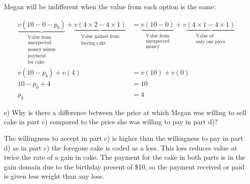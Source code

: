 \documentclass[
  letterpaper,
  DIV=11,
  numbers=noendperiod]{scrreprt}
\begin{document}
\begin{tcolorbox}[enhanced jigsaw, title=\textcolor{quarto-callout-tip-color}{\faLightbulb}\hspace{0.5em}{Answer}, toprule=.15mm, colback=white, breakable, titlerule=0mm, colframe=quarto-callout-tip-color-frame, coltitle=black, opacityback=0, rightrule=.15mm, colbacktitle=quarto-callout-tip-color!10!white, bottomtitle=1mm, opacitybacktitle=0.6, arc=.35mm, bottomrule=.15mm, toptitle=1mm, leftrule=.75mm, left=2mm]

Megan will be indifferent when the value from each option is the same:

\begin{align*}
\underbrace{v(10-0-p_b)}_{\substack{\textrm{Value from} \\ \textrm{unexpected} \\ \textrm{money minus} \\  \textrm{payment} \\ \textrm{for cake}}}+
\underbrace{v(4\times 2-4\times 1)}_{\substack{\textrm{Value gained from} \\ \textrm{buying cake}}}
&=\underbrace{v(10-0)}_{\substack{\textrm{Value from} \\ \textrm{unexpected} \\ \textrm{money}}}+
v\underbrace{(4\times 1-4\times 1)}_{\substack{\textrm{Value of} \\ \textrm{only one piece}}} \\[12pt]
v(10-p_b)+v(4)&=v(10)+v(0) \\[6pt]
10-p_b+4&=10\\[6pt]
p_b&=4
\end{align*}

\end{tcolorbox}

e) Why is there a difference between the price at which Megan was
willing to sell cake in part c) compared to the price she was willing to
pay in part d)?

\begin{tcolorbox}[enhanced jigsaw, title=\textcolor{quarto-callout-tip-color}{\faLightbulb}\hspace{0.5em}{Answer}, toprule=.15mm, colback=white, breakable, titlerule=0mm, colframe=quarto-callout-tip-color-frame, coltitle=black, opacityback=0, rightrule=.15mm, colbacktitle=quarto-callout-tip-color!10!white, bottomtitle=1mm, opacitybacktitle=0.6, arc=.35mm, bottomrule=.15mm, toptitle=1mm, leftrule=.75mm, left=2mm]

The willingness to accept in part c) is higher than the willingness to
pay in part d) as in part c) the foregone cake is coded as a loss. This
loss reduces value at twice the rate of a gain in cake. The payment for
the cake in both parts is in the gain domain due to the birthday present
of \$10, so the payment received or paid is given less weight than any
loss.

\end{tcolorbox}
\end{document}
